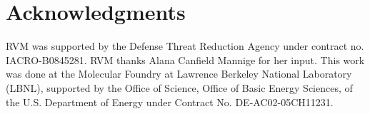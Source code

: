 \documentclass[fleqn,10pt]{wlpeerj} %
\begin{document}
\section*{Acknowledgments}

RVM was supported by the Defense Threat Reduction Agency under contract no. IACRO-B0845281. RVM thanks Alana Canfield Mannige for her input. This work was done at the Molecular Foundry at Lawrence Berkeley National Laboratory (LBNL), supported by the Office of Science, Office of Basic Energy Sciences, of the U.S. Department of Energy under Contract No. DE-AC02-05CH11231.


\end{document}
